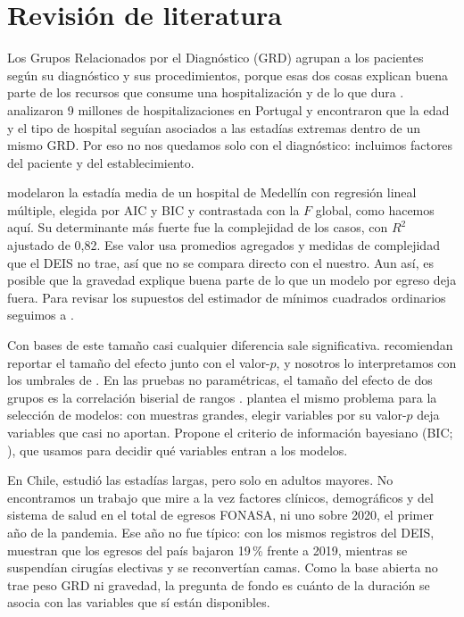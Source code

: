 \documentclass[10.5pt,a4paper,headings=small,abstract=false,bibliography=totoc,listof=totoc]{scrartcl}
\newcommand{\pct}{\,\%}
\begin{document}
\section{Revisión de literatura}

Los Grupos Relacionados por el Diagnóstico (GRD) agrupan a los pacientes según su diagnóstico y sus procedimientos, porque esas dos cosas explican buena parte de los recursos que consume una hospitalización y de lo que dura \citep{fetter1980}. \citet{freitas2012} analizaron 9 millones de hospitalizaciones en Portugal y encontraron que la edad y el tipo de hospital seguían asociados a las estadías extremas dentro de un mismo GRD. Por eso no nos quedamos solo con el diagnóstico: incluimos factores del paciente y del establecimiento.

\citet{gomez2023} modelaron la estadía media de un hospital de Medellín con regresión lineal múltiple, elegida por AIC y BIC y contrastada con la $F$ global, como hacemos aquí. Su determinante más fuerte fue la complejidad de los casos, con $R^2$ ajustado de 0,82. Ese valor usa promedios agregados y medidas de complejidad que el DEIS no trae, así que no se compara directo con el nuestro. Aun así, es posible que la gravedad explique buena parte de lo que un modelo por egreso deja fuera. Para revisar los supuestos del estimador de mínimos cuadrados ordinarios seguimos a \citet{rodriguez2017}.

Con bases de este tamaño casi cualquier diferencia sale significativa. \citet{lin2013} recomiendan reportar el tamaño del efecto junto con el valor-$p$, y nosotros lo interpretamos con los umbrales de \citet{cohen1988}. En las pruebas no paramétricas, el tamaño del efecto de dos grupos es la correlación biserial de rangos \citep{kerby2014}. \citet{raftery1995} plantea el mismo problema para la selección de modelos: con muestras grandes, elegir variables por su valor-$p$ deja variables que casi no aportan. Propone el criterio de información bayesiano (BIC; \citealt{schwarz1978}), que usamos para decidir qué variables entran a los modelos.

En Chile, \citet{olivares2020} estudió las estadías largas, pero solo en adultos mayores. No encontramos un trabajo que mire a la vez factores clínicos, demográficos y del sistema de salud en el total de egresos FONASA, ni uno sobre 2020, el primer año de la pandemia. Ese año no fue típico: con los mismos registros del DEIS, \citet{barahona2021} muestran que los egresos del país bajaron 19\pct{} frente a 2019, mientras se suspendían cirugías electivas y se reconvertían camas. Como la base abierta no trae peso GRD ni gravedad, la pregunta de fondo es cuánto de la duración se asocia con las variables que sí están disponibles.
\end{document}

